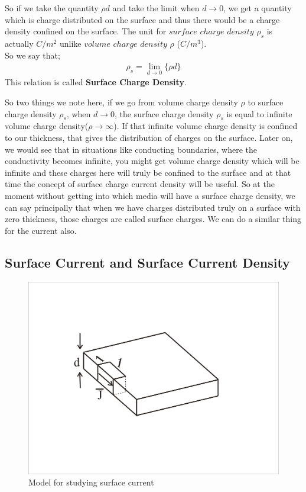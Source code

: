 So if we take the quantity $\rho d$ and take the limit when $d\rightarrow0$, we get a quantity which is charge distributed on the surface and thus there would be a charge density confined on the surface. The unit for $surface$ $charge$ $density$ $\rho_{s}$ is actually $C/m^{2}$ unlike $volume$ $charge$ $density$ $\rho$ ($C/m^{3}$).\\
So we say that;
\begin{align}
\rho_{s}=\lim_{d\rightarrow0}\{\rho d\} 
\end{align}
This relation is called \textbf{Surface Charge Density}.

So two things we note here, if we go from volume charge density $\rho$ to surface charge density $\rho_{s}$, when $d\rightarrow0$, the surface charge density $\rho_{s}$ is equal to infinite volume charge density($\rho\rightarrow\infty$). If that infinite volume charge density is confined to our thickness, that gives the distribution of charges on the surface. Later on, we would see that in situations like conducting boundaries, where the conductivity becomes infinite, you might get volume charge density which will be infinite and these charges here will truly be confined to the surface and at that time the concept of surface charge current density will be useful. So at the moment without getting into which media will have a surface charge density, we can say principally that when we have charges distributed truly on a surface with zero thickness, those charges are called surface charges. We can do a similar thing for the current also.

\subsection{Surface Current and Surface Current Density}
\begin{figure}[h]
\centering
\includegraphics[width=0.7\linewidth]{./graphics/surfacecurrent}
\caption{Model for studying surface current}
\end{figure} 


